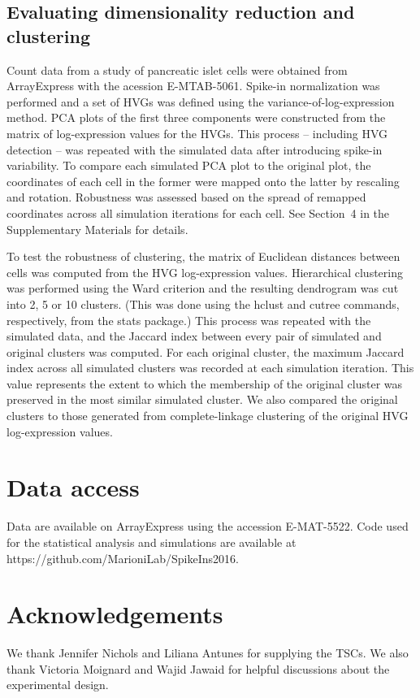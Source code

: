 \documentclass{article}
\newcommand{\suppsecsim}{4}
\begin{document}
\subsection*{Evaluating dimensionality reduction and clustering}
Count data from a study of pancreatic islet cells \citep{segerstople2016single} were obtained from ArrayExpress with the acession E-MTAB-5061.
Spike-in normalization was performed and a set of HVGs was defined using the variance-of-log-expression method.
PCA plots of the first three components were constructed from the matrix of log-expression values for the HVGs.
This process -- including HVG detection -- was repeated with the simulated data after introducing spike-in variability.
To compare each simulated PCA plot to the original plot, the coordinates of each cell in the former were mapped onto the latter by rescaling and rotation.
Robustness was assessed based on the spread of remapped coordinates across all simulation iterations for each cell.
See Section~\suppsecsim{} in the Supplementary Materials for details.

To test the robustness of clustering, the matrix of Euclidean distances between cells was computed from the HVG log-expression values. 
Hierarchical clustering was performed using the Ward criterion and the resulting dendrogram was cut into 2, 5 or 10 clusters.
(This was done using the hclust and cutree commands, respectively, from the stats package.)
This process was repeated with the simulated data, and the Jaccard index between every pair of simulated and original clusters was computed.
For each original cluster, the maximum Jaccard index across all simulated clusters was recorded at each simulation iteration.
This value represents the extent to which the membership of the original cluster was preserved in the most similar simulated cluster.
We also compared the original clusters to those generated from complete-linkage clustering of the original HVG log-expression values.

\section*{Data access}
Data are available on ArrayExpress using the accession E-MAT-5522.
Code used for the statistical analysis and simulations are available at https://github.com/MarioniLab/SpikeIns2016.

\section*{Acknowledgements}
We thank Jennifer Nichols and Liliana Antunes for supplying the TSCs.
We also thank Victoria Moignard and Wajid Jawaid for helpful discussions about the experimental design.
\end{document}
